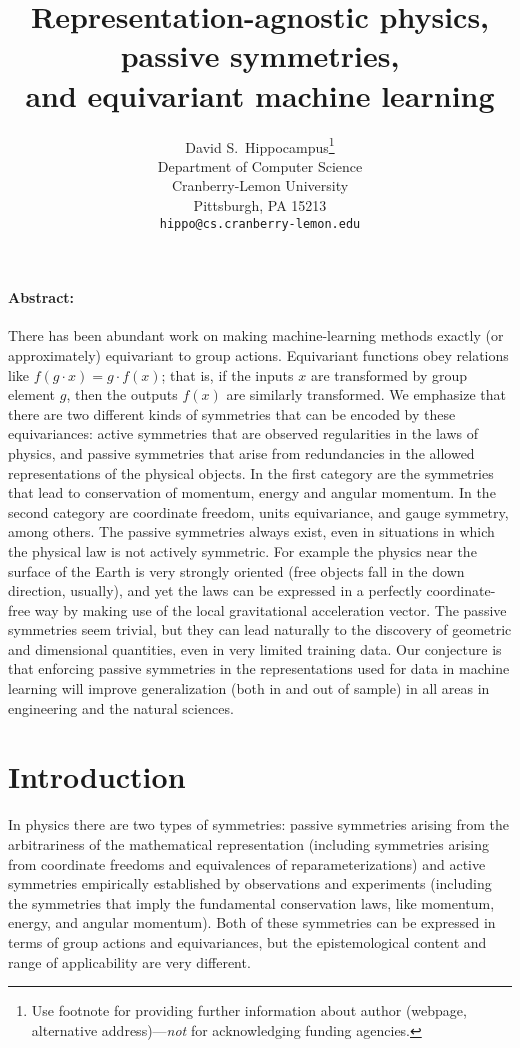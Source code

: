 \documentclass{article}
\title{Representation-agnostic physics, passive symmetries,\\ and equivariant machine learning}
\author{%
  David S.~Hippocampus\thanks{Use footnote for providing further information
    about author (webpage, alternative address)---\emph{not} for acknowledging
    funding agencies.} \\
  Department of Computer Science\\
  Cranberry-Lemon University\\
  Pittsburgh, PA 15213 \\
  \texttt{hippo@cs.cranberry-lemon.edu} \\
}
\begin{document}
\maketitle

\paragraph{Abstract:} 
There has been abundant work on making machine-learning methods exactly (or approximately) equivariant to group actions.
Equivariant functions obey relations like $f(g\cdot x) = g\cdot f(x)$; that is, if the inputs $x$ are transformed by group element $g$, then the outputs $f(x)$ are similarly transformed.
We emphasize that there are two different kinds of symmetries that can be encoded by these equivariances: active symmetries that are observed regularities in the laws of physics, and passive symmetries that arise from redundancies in the allowed representations of the physical objects. 
In the first category are the symmetries that lead to conservation of momentum, energy and angular momentum. In the second category are coordinate freedom, units equivariance, and gauge symmetry, among others.  
The passive symmetries always exist, even in situations in which the physical law is not actively symmetric.
For example the physics near the surface of the Earth is very strongly oriented (free objects fall in the down direction, usually), and yet the laws can be expressed in a perfectly coordinate-free way by making use of the local gravitational acceleration vector.
The passive symmetries seem trivial, but they can lead naturally to the discovery of geometric and dimensional quantities, even in very limited training data.
Our conjecture is that enforcing passive symmetries in the representations used for data in machine learning will improve generalization (both in and out of sample) in all areas in engineering and the natural sciences.

\section{Introduction}

In physics there are two types of symmetries: passive symmetries arising from the arbitrariness of the mathematical representation (including symmetries arising from coordinate freedoms and equivalences of reparameterizations) and active symmetries empirically established by observations and experiments (including the symmetries that imply the fundamental conservation laws, like momentum, energy, and angular momentum). Both of these symmetries can be expressed in terms of group actions and equivariances, but the epistemological content and range of applicability are very different. 
\end{document}
